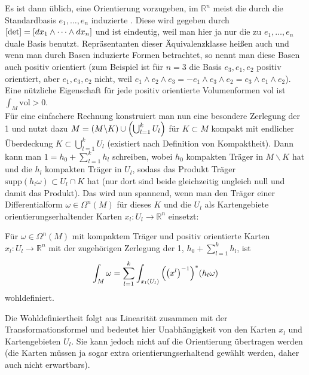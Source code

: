 \documentclass[../H_Analysis_main.tex]{subfiles}
\begin{document}


Es ist dann üblich, eine Orientierung vorzugeben, im $\mathbb{R}^n$ meist die durch die Standardbasis $e_1, \dots, e_n$ induzierte . Diese wird gegeben durch $\qty[\det] = \qty[dx_1 \wedge \dots \wedge dx_n]$ und ist eindeutig, weil man hier ja nur die zu $e_1, \dots, e_n$ duale Basis benutzt. Repräsentanten dieser Äquivalenzklasse heißen auch  und wenn man durch Basen induzierte Formen betrachtet, so nennt man diese Basen auch positiv orientiert (zum Beispiel ist für $n = 3$ die Basis $e_3, e_1, e_2$ positiv orientiert, aber $e_1, e_3, e_2$ nicht, weil $e_1 \wedge e_2 \wedge e_3 = - e_1 \wedge e_3 \wedge e_2 = e_3 \wedge e_1 \wedge e_2$). Eine nützliche Eigenschaft für jede positiv orientierte Volumenformen $\text{vol}$ ist $\int_M \text{vol} > 0$.\\


Für eine einfachere Rechnung konstruiert man nun eine besondere Zerlegung der 1 und nutzt dazu $M = \qty(M \backslash K) \cup \qty(\bigcup_{l = 1}^k U_l)$ für $K \subset M$ kompakt mit endlicher Überdeckung $K \subset \bigcup_{l = 1}^k U_l$ (existiert nach Definition von Kompaktheit). Dann kann man $1 = h_0 + \sum_{l = 1}^k h_l$ schreiben, wobei $h_0$ kompakten Träger in $M \backslash K$ hat und die $h_l$ kompakten Träger in $U_l$, sodass das Produkt Träger $\text{supp}(h_l \omega) \subset U_l \cap K$ hat (nur dort sind beide gleichzeitig ungleich null und damit das Produkt). Das wird nun spannend, wenn man den Träger einer Differentialform $\omega \in \Omega^n(M)$ für dieses $K$ und die $U_l$ als Kartengebiete orientierungserhaltender Karten $x_l: U_l \rightarrow \mathbb{R}^n$ einsetzt:
\begin{cor}\label{cor:diffintberprakt}
Für $\omega \in \Omega^n(M)$ mit kompaktem Träger und positiv orientierte Karten $x_l: U_l \rightarrow \mathbb{R}^n$ mit der zugehörigen Zerlegung der 1, $\displaystyle h_0 + \sum_{l = 1}^k h_l$, ist
\begin{equation}
\int_M \omega = \sum_{l = 1}^k \int_{x_l(U_l)} \qty(\qty(x^l)^{-1})^* \qty(h_l \omega)
\end{equation}
wohldefiniert.
\end{cor}
Die Wohldefiniertheit folgt aus Linearität zusammen mit der Transformationsformel und bedeutet hier Unabhängigkeit von den Karten $x_l$ und Kartengebieten $U_l$. Sie kann jedoch nicht auf die Orientierung übertragen werden (die Karten müssen ja sogar extra orientierungserhaltend gewählt werden, daher auch nicht erwartbars).
\end{document}
